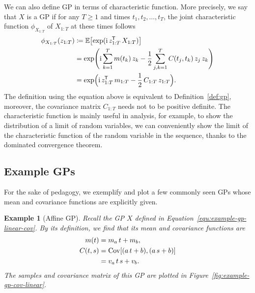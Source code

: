 \documentclass[]{article}
\newtheorem{example}[theorem]{Example}
\begin{document}
We can also define GP in terms of characteristic function. More precisely, we say that $X$ is a GP if for any $T\geq 1$ and times $t_1, t_2, \ldots, t_T$, the joint characteristic function $\phi_{X_{1:T}}$ of $X_{1:T}$ at these times follows
%
\begin{equation}
	\begin{split}
		\phi_{X_{1:T}}(z_{1:T}) &\coloneqq \operatorname{\mathbb{E}} \bigl[ \exp(\mathrm{i} \, z_{1:T}^{\mkern-1.5mu\mathsf{T}} \, X_{1:T}) \bigr]\\
		&= \exp\Biggl(\mathrm{i} \sum^T_{k=1} m(t_k) \, z_k - \frac{1}{2} \sum^T_{j,k=1} C(t_j, t_k) \, z_j \, z_k \Biggr)  \\
		&= \exp \Bigl( \mathrm{i} \, z_{1:T}^{\mkern-1.5mu\mathsf{T}} \, m_{1:T} - \frac{1}{2} \, C_{1:T} \, z_{1:T} \Bigr).
	\end{split}
	\label{equ:gp-characteristic-func}
\end{equation}
%
The definition using the equation above is equivalent to Definition~\ref{def:gp}, moreover, the covariance matrix $C_{1:T}$ needs not to be positive definite. The characteristic function is mainly useful in analysis, for example, to show the distribution of a limit of random variables, we can conveniently show the limit of the characteristic function of the random variable in the sequence, thanks to the dominated convergence theorem.

\subsection{Example GPs}

For the sake of pedagogy, we exemplify and plot a few commonly seen GPs whose mean and covariance functions are explicitly given.

\begin{example}[Affine GP]
	\label{example:affine-gp}
	Recall the GP $X$ defined in Equation~\eqref{equ:example-gp-linear-cov}. By its definition, we find that its mean and covariance functions are 
	\begin{equation}
		\begin{split}
			m(t) &= m_a \, t + m_b, \\
			C(t, s) &= \cov{(a \, t + b), (a \, s + b)} \\
			&= v_a \, t \, s + v_b.
			\label{equ:affine-gp-mean-cov}
		\end{split}
	\end{equation}
	The samples and covariance matrix of this GP are plotted in Figure~\ref{fig:example-gp-cov-linear}.
\end{example}
\end{document}
